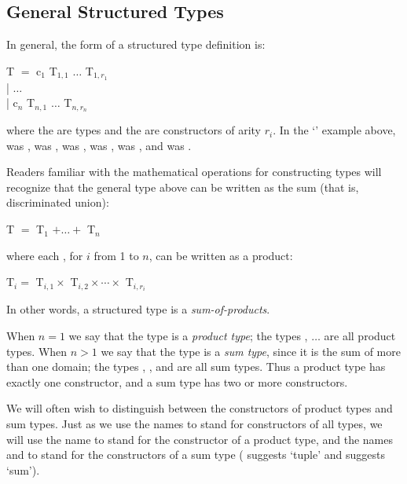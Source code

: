 \subsection{General Structured Types}

In general, the form of a structured type definition is:

\begin{mlcoded}
    T \hastype$=$ c$_1$ T$_{1,1}$ $\ldots$ T$_{1,r_1}$\\
    \quad | $\ldots$\\
    \quad | c$_n$ T$_{n,1}$ $\ldots$ T$_{n,r_n}$\\
\end{mlcoded}
where the  are types and the  are constructors of arity $r_i$. In the `' example above,  was ,  was ,  was ,  was ,  was , and  was .

Readers familiar with the mathematical operations for constructing types will recognize that the general type above can be written as the sum (that is, discriminated union):
\begin{mlcoded}
T $=$ T$_1$ $+ \ldots +$ T$_n$
\end{mlcoded}
where each , for $i$ from 1 to $n$, can be written as a product:
\begin{mlcoded}
T$_i =$ T$_{i,1} \times$ T$_{i,2} \times \cdots \times$ T$_{i,r_i}$
\end{mlcoded}
In other words, a structured type is a \textit{sum-of-products}.

When $n=1$ we say that the type is a \textit{product type}; the types , $\ldots$ are all product types. When $n>1$ we say that the type is a \textit{sum type}, since it is the sum of more than one domain; the types , ,  and  are all sum types. Thus a product type has exactly one constructor, and a sum type has two or more constructors.

We will often wish to distinguish between the constructors of product types and sum types. Just as we use the names  to stand for constructors of all types, we will use the name  to stand for the constructor of a product type, and the names  and  to stand for the constructors of a sum type ( suggests `tuple' and  suggests `sum').


